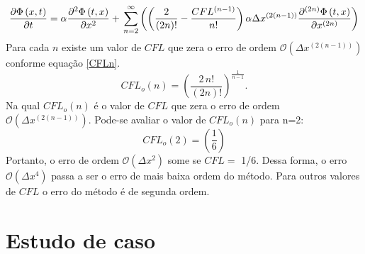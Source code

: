 \documentclass[10pt,twoside,a4paper]{article}
\begin{document}
\begin{equation} \label{equacao_modificadaCFL}
\frac{\partial \Phi \left( x,t \right)}{\partial t} = \alpha \frac{\partial^{2} \Phi \left(t, x\right)}{\partial x^{2}}+ \\
\sum\limits_{n=2}^{\infty}\left( \left(\frac{ 2  }{\left(2n\right)!} -\frac{CFL^{\left(n-1\right)}  }{n!}\right) \alpha \Delta x^{\left(2\left(n-1\right)\right)} \frac{\partial^{\left(2n\right)} \Phi \left(t, x\right)}{\partial x^{\left(2n\right)}}\right)
\end{equation}
Para cada $n$ existe um valor de $CFL$ que zera o erro de ordem  $\mathcal{O}\left(\Delta x^{\left(2\left(n-1\right)\right)}\right)$ conforme equação \ref{CFLn}.
\begin{equation} \label{CFLn}
CFL_o\left(n\right)=\left(\frac{2 \, n!}{(2n)!}\right)^\frac{1}{n-1}.
\end{equation}
Na qual $CFL_o\left(n\right)$ é o valor de $CFL$ que zera o erro de ordem  $\mathcal{O}\left(\Delta x^{\left(2\left(n-1\right)\right)}\right)$. Pode-se avaliar o valor de $CFL_o\left(n\right)$ para n=2:
\begin{equation} \label{CFL_otimo}
CFL_o\left(2\right)=\left(\frac{1}{6}\right)
\end{equation}
Portanto, o erro de ordem $\mathcal{O}(\Delta x^2)$ some se $CFL=$ 1/6. Dessa forma, o erro $\mathcal{O}(\Delta x^4)$ passa a ser o erro de mais baixa ordem do método. Para outros valores de $CFL$ o erro do método é de segunda ordem.
\section{Estudo de caso} %
\end{document}
